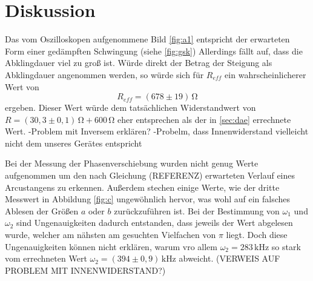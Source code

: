 \section{Diskussion}
\label{sec:Diskussion}
Das vom Oszilloskopen aufgenommene Bild \ref{fig:a1}
entspricht der erwarteten Form einer gedämpften Schwingung (siehe \ref{fig:gsk})
Allerdings fällt auf, dass die Abklingdauer viel zu groß ist.
Würde direkt der Betrag der Steigung als Abklingdauer angenommen werden,
so würde sich für $R_{eff}$ ein wahrscheinlicherer Wert von
\begin{equation*}
    R_{eff}=(678\pm19)\,\si{\ohm}
\end{equation*}
\noindent ergeben. Dieser Wert würde dem tatsächlichen Widerstandwert
von $R=(30,3\pm0,1)\,\si{\ohm} + 600\,\si{\ohm}$ eher entsprechen als der
in \ref{sec:dae} errechnete Wert.
-Problem mit Inversem erklären?
-Probelm, dass Innenwiderstand vielleicht nicht dem
unseres Gerätes entspricht


Bei der Messung der Phasenverschiebung wurden nicht
genug Werte aufgenommen um den nach Gleichung (REFERENZ)
erwarteten Verlauf eines Arcustangens zu erkennen.
Außerdem stechen einige Werte, wie der dritte Messwert
in Abbildung \ref{fig:c} ungewöhnlich hervor, was
wohl auf ein falsches Ablesen der Größen $a$ oder
$b$ zurückzuführen ist. Bei der Bestimmung
von $\omega_1$ und $\omega_2$ sind Ungenauigkeiten
dadurch entstanden, dass jeweils der Wert abgelesen wurde,
welcher am nähsten am gesuchten Vielfachen von $\pi$
liegt. Doch diese Ungenauigkeiten können nicht erklären,
warum vro allem $\omega_2=283\,\si{\kilo\hertz}$ so stark vom errechneten Wert
$\omega_2=(394\pm0,9)\,\si{\kilo\hertz}$ abweicht.
(VERWEIS AUF PROBLEM MIT INNENWIDERSTAND?)